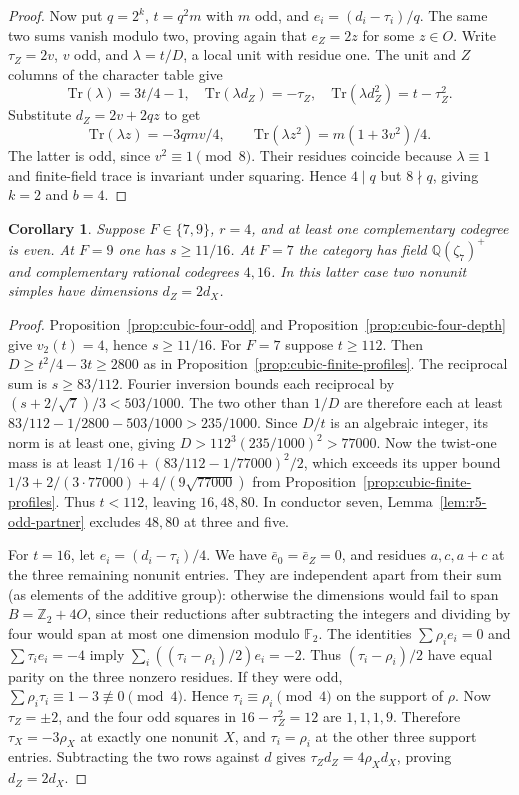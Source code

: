 \documentclass[11pt,a4paper]{article}
\newtheorem{corollary}[theorem]{Corollary}
\numberwithin{equation}{section}
\begin{document}
\begin{proof}
Now put $q=2^k$, $t=q^2m$ with $m$ odd, and $e_i=(d_i-\tau_i)/q$. The same two sums vanish modulo two, proving again that $e_Z=2z$ for some $z\in O$. Write $\tau_Z=2v$, $v$ odd, and $\lambda=t/D$, a local unit with residue one. The unit and $Z$ columns of the character table give
\[
 \mathrm{Tr}(\lambda)=3t/4-1,\quad
 \mathrm{Tr}(\lambda d_Z)=-\tau_Z,\quad
 \mathrm{Tr}(\lambda d_Z^2)=t-\tau_Z^2.
\]
Substitute $d_Z=2v+2qz$ to get
\[
 \mathrm{Tr}(\lambda z)=-3qmv/4,\qquad
 \mathrm{Tr}(\lambda z^2)=m(1+3v^2)/4 .
\]
The latter is odd, since $v^2\equiv1\pmod8$. Their residues coincide because $\lambda\equiv1$ and finite-field trace is invariant under squaring. Hence $4\mid q$ but $8\nmid q$, giving $k=2$ and $b=4$.
\end{proof}

\begin{corollary}\label{cor:cubic-profile}
Suppose $F\in\{7,9\}$, $r=4$, and at least one complementary codegree is even. At $F=9$ one has $s\ge11/16$. At $F=7$ the category has field $\mathbb Q(\zeta_7)^+$ and complementary rational codegrees $4,16$. In this latter case two nonunit simples have dimensions $d_Z=2d_X$.
\end{corollary}
\begin{proof}
Proposition~\ref{prop:cubic-four-odd} and Proposition~\ref{prop:cubic-four-depth} give $v_2(t)=4$, hence $s\ge11/16$. For $F=7$ suppose $t\ge112$. Then $D\ge t^2/4-3t\ge2800$ as in Proposition~\ref{prop:cubic-finite-profiles}. The reciprocal sum is $s\ge83/112$. Fourier inversion bounds each reciprocal by $(s+2/\sqrt7)/3<503/1000$. The two other than $1/D$ are therefore each at least $83/112-1/2800-503/1000>235/1000$. Since $D/t$ is an algebraic integer, its norm is at least one, giving $D>112^3(235/1000)^2>77000$. Now the twist-one mass is at least $1/16+(83/112-1/77000)^2/2$, which exceeds its upper bound $1/3+2/(3\cdot77000)+4/(9\sqrt{77000})$ from Proposition~\ref{prop:cubic-finite-profiles}. Thus $t<112$, leaving $16,48,80$. In conductor seven, Lemma~\ref{lem:r5-odd-partner} excludes $48,80$ at three and five.

For $t=16$, let $e_i=(d_i-\tau_i)/4$. We have $\bar e_0=\bar e_Z=0$, and residues $a,c,a+c$ at the three remaining nonunit entries. They are independent apart from their sum (as elements of the additive group): otherwise the dimensions would fail to span $B=\mathbb Z_2+4O$, since their reductions after subtracting the integers and dividing by four would span at most one dimension modulo $\mathbb F_2$. The identities $\sum\rho_i e_i=0$ and $\sum\tau_i e_i=-4$ imply $\sum_i((\tau_i-\rho_i)/2)e_i=-2$. Thus $(\tau_i-\rho_i)/2$ have equal parity on the three nonzero residues. If they were odd, $\sum\rho_i\tau_i\equiv1-3\not\equiv0\pmod4$. Hence $\tau_i\equiv\rho_i\pmod4$ on the support of $\rho$. Now $\tau_Z=\pm2$, and the four odd squares in $16-\tau_Z^2=12$ are $1,1,1,9$. Therefore $\tau_X=-3\rho_X$ at exactly one nonunit $X$, and $\tau_i=\rho_i$ at the other three support entries. Subtracting the two rows against $d$ gives $\tau_Z d_Z=4\rho_Xd_X$, proving $d_Z=2d_X$.
\end{proof}
\end{document}
